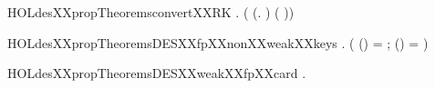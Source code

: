 \newcommand{\HOLdesXXpropTheoremscompleXXproperty}{\UseVerbatim{HOLdesXXpropTheoremscompleXXproperty}}
\begin{SaveVerbatim}{HOLdesXXpropTheoremsconvertXXRK}
\HOLTokenTurnstile{} \HOLSymConst{\HOLTokenForall{}} .    \HOLSymConst{=}  ( (\HOLTokenLambda{}.   ) ( ))
\end{SaveVerbatim}
\newcommand{\HOLdesXXpropTheoremsconvertXXRK}{\UseVerbatim{HOLdesXXpropTheoremsconvertXXRK}}
\begin{SaveVerbatim}{HOLdesXXpropTheoremsDESXXfpXXnonXXweakXXkeys}
\HOLTokenTurnstile{} \HOLSymConst{\HOLTokenForall{}}.  \HOLSymConst{\HOLTokenLt{}}   \HOLSymConst{\HOLTokenImp{}}
       (
          (\HOLSymConst{,}) =   ;
          (\HOLSymConst{,}) =  
            \HOLSymConst{=} )
\end{SaveVerbatim}
\newcommand{\HOLdesXXpropTheoremsDESXXfpXXnonXXweakXXkeys}{\UseVerbatim{HOLdesXXpropTheoremsDESXXfpXXnonXXweakXXkeys}}
\begin{SaveVerbatim}{HOLdesXXpropTheoremsDESXXweakXXfpXXcard}
\HOLTokenTurnstile{} \HOLSymConst{\HOLTokenForall{}}.    \HOLSymConst{\HOLTokenImp{}}   \HOLSymConst{=}  \HOLSymConst{\HOLTokenExp{}} 
\end{SaveVerbatim}
\newcommand{\HOLdesXXpropTheoremsDESXXweakXXfpXXcard}{\UseVerbatim{HOLdesXXpropTheoremsDESXXweakXXfpXXcard}}
